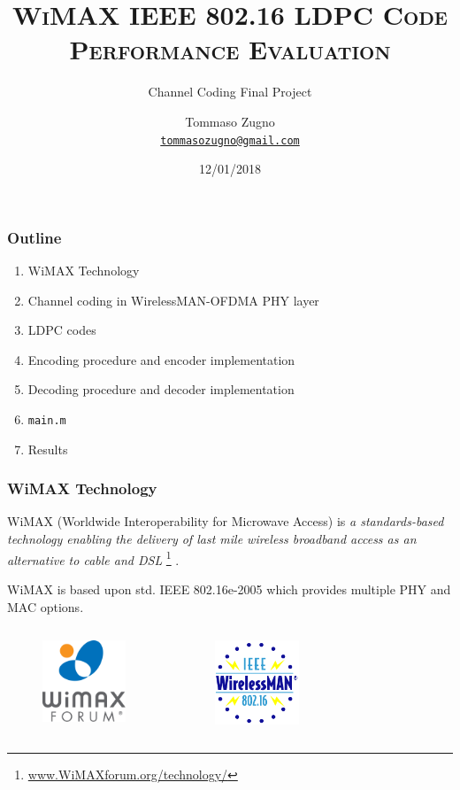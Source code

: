\documentclass[]{beamer}
\title[]{\textsc{WiMAX IEEE 802.16 LDPC Code \\ Performance Evaluation}}
\subtitle[]{\vspace{0.3cm} \textcolor{black!50}{Channel Coding Final Project}}
\author[]{Tommaso Zugno \\ \href{mailto:tommasozugno@gmail.com}{ \textcolor{black!50}{\texttt{\footnotesize{tommasozugno@gmail.com}}}}
}
\date[]{12/01/2018}
\begin{document}
\frame{\titlepage} %
\section{   }

\begin{frame}
\transwipe[direction=0]
\frametitle{Outline}
\begin{enumerate}
\item WiMAX Technology
\item Channel coding in WirelessMAN-OFDMA PHY layer
\item LDPC codes
\item Encoding procedure and encoder implementation
\item Decoding procedure and decoder implementation
\item \texttt{main.m}
\item Results
\end{enumerate}
\end{frame}


\begin{frame}
\transwipe[direction=0]
\frametitle{WiMAX Technology}
WiMAX (Worldwide Interoperability for Microwave Access) is \textit{a standards-based technology enabling the delivery of last mile wireless broadband access as an alternative to cable and DSL} \footnote{\url{www.WiMAXforum.org/technology/}} .

\vspace{0.3cm}
WiMAX is based upon std. IEEE 802.16e-2005 which provides multiple PHY and MAC options.

\begin{columns}
			\begin{figure}
				\centering
					\includegraphics[width=2.5cm]{figure1/WiMAX}
			\end{figure}
			\begin{figure}
				\centering
					\includegraphics[width=2.5cm]{figure1/wirelessman}
			\end{figure}
	\end{columns}
\centering
\end{frame}
\end{document}
